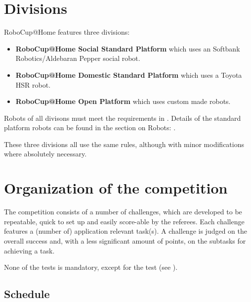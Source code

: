 \section{Divisions}
RoboCup@Home features three divisions:
\begin{itemize}
 \item \textbf{RoboCup@Home Social Standard Platform} which uses an Softbank Robotics/Aldebaran Pepper social robot.
 \item \textbf{RoboCup@Home Domestic Standard Platform} which uses a Toyota HSR robot.
 \item \textbf{RoboCup@Home Open Platform} which uses custom made robots. 
\end{itemize}
Robots of all divisons must meet the requirements in . 
Details of the standard platform robots can be found in the section on Robots: . 

These three divisions all use the same rules, although with minor modifications where absolutely necessary. 

\section{Organization of the competition}
\label{sec:procedure_during_competition}

The competition consists of a number of challenges, which are developed to be repeatable, quick to set up and easily score-able by the referees. 
Each challenge features a (number of) application relevant task(s). 
A challenge is judged on the overall success and, with a less significant amount of points, on the subtasks for achieving a task. 

None of the tests is mandatory, except for the  test (see ).

\subsection{Schedule}
\label{rule:schedule}

